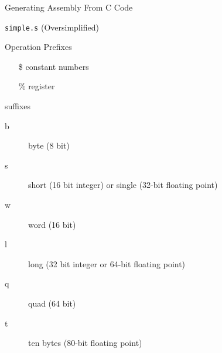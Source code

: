 \begin{frame}{Generating Assembly From C Code}
  \begin{minipage}{.35\linewidth}
    \begin{block}{\texttt{simple.s} \scriptsize{(Oversimplified)}}
      \begin{center}
      \end{center}
    \end{block}
    \begin{block}{Operation Prefixes}
      \begin{itemize}
      \item[\$] constant numbers
      \item[\%] register
      \end{itemize}
    \end{block}
  \end{minipage}\qquad
  \begin{minipage}{.55\linewidth}
    \begin{block}{suffixes}
      \begin{description}
      \item[b] byte (8 bit)
      \item[s] short (16 bit integer) or single (32-bit floating point)
      \item[w] word (16 bit)
      \item[l] long (32 bit integer or 64-bit floating point)
      \item[q] quad (64 bit)
      \item[t] ten bytes (80-bit floating point)
      \end{description}
    \end{block}
  \end{minipage}
\end{frame}

\begin{center}
\end{center}

